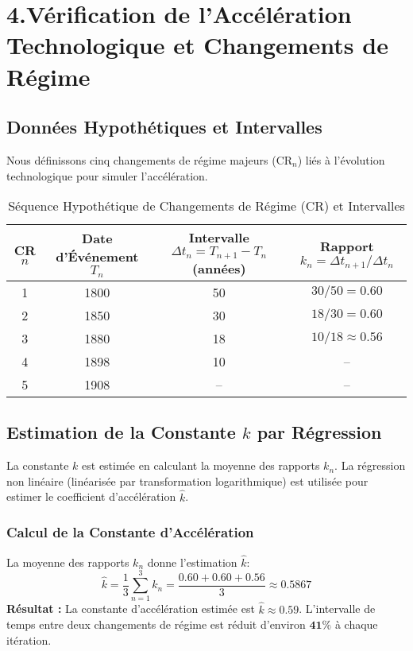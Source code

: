 \documentclass[a4paper,12pt]{report}
\begin{document}
	\section*{4.Vérification de l'Accélération Technologique et Changements de Régime}
	\label{sec:verification_acceleration}
	
	\subsection*{Données Hypothétiques et Intervalles}
	Nous définissons cinq changements de régime majeurs ($\text{CR}_n$) liés à l'évolution technologique pour simuler l'accélération.
	\begin{table}[h]
		\centering
		\caption{Séquence Hypothétique de Changements de Régime (CR) et Intervalles}
		\label{tab:dates_regimes}
		\begin{tabular}{|c|c|c|c|}
			\hline
			\textbf{CR} $n$ & \textbf{Date d'Événement} $T_n$ & \textbf{Intervalle} $\Delta t_n = T_{n+1} - T_n$ (années) & \textbf{Rapport} $k_n = \Delta t_{n+1} / \Delta t_n$ \\
			\hline
			1 & 1800 & 50 & $30/50 = 0.60$ \\
			2 & 1850 & 30 & $18/30 = 0.60$ \\
			3 & 1880 & 18 & $10/18 \approx 0.56$ \\
			4 & 1898 & 10 & -- \\
			5 & 1908 & -- & -- \\
			\hline
		\end{tabular}
	\end{table}
	
	\subsection*{Estimation de la Constante $k$ par Régression}
	La constante $k$ est estimée en calculant la moyenne des rapports $k_n$. La régression non linéaire (linéarisée par transformation logarithmique) est utilisée pour estimer le coefficient d'accélération $\hat{k}$.
	\subsubsection{Calcul de la Constante d'Accélération}
	La moyenne des rapports $k_n$ donne l'estimation $\hat{k}$:
	$$
	\hat{k} = \frac{1}{3} \sum_{n=1}^3 k_n = \frac{0.60 + 0.60 + 0.56}{3} \approx \mathbf{0.5867}
	$$
	\textbf{Résultat :} La constante d'accélération estimée est $\hat{k} \approx 0.59$. L'intervalle de temps entre deux changements de régime est réduit d'environ $\mathbf{41\%}$ à chaque itération.
	
\end{document}
